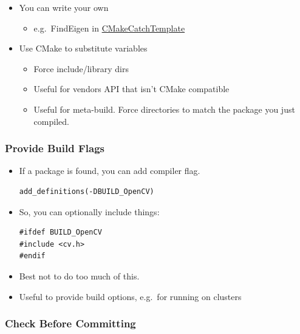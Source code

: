\begin{itemize}
\itemsep1pt\parskip0pt
\item
  You can write your own

  \begin{itemize}
  \itemsep1pt\parskip0pt
  \item
    e.g.~FindEigen in
    \href{https://github.com/MattClarkson/CMakeCatchTemplate/blob/master/CMake/FindEigen.cmake}{CMakeCatchTemplate}
  \end{itemize}
\item
  Use CMake to substitute variables

  \begin{itemize}
  \itemsep1pt\parskip0pt
  \item
    Force include/library dirs
  \item
    Useful for vendors API that isn't CMake compatible
  \item
    Useful for meta-build. Force directories to match the package you
    just compiled.
  \end{itemize}
\end{itemize}

\subsubsection{Provide Build Flags}\label{provide-build-flags}

\begin{itemize}
\item
  If a package is found, you can add compiler flag.

\begin{verbatim}
add_definitions(-DBUILD_OpenCV)
\end{verbatim}
\item
  So, you can optionally include things:

\begin{verbatim}
#ifdef BUILD_OpenCV
#include <cv.h>
#endif
\end{verbatim}
\item
  Best not to do too much of this.
\item
  Useful to provide build options, e.g.~for running on clusters
\end{itemize}

\subsubsection{Check Before Committing}\label{check-before-committing}


